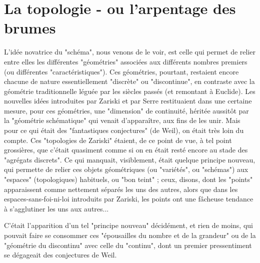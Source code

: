 \section{La topologie - ou l'arpentage des brumes}

L'idée novatrice du "schéma", nous venons de le voir, est celle qui permet de relier entre elles les différentes "géométries" associées aux différents nombres premiers (ou différentes "caractéristiques"). Ces géométries, pourtant, restaient encore chacune de nature essentiellement "discrète" ou "discontinue", en contraste avec la géométrie traditionnelle léguée par les siècles passés (et remontant à Euclide). Les nouvelles idées introduites par Zariski et par Serre restituaient dans une certaine mesure, pour ces géométries, une "dimension" de continuité, héritée aussitôt par la "géométrie schématique" qui venait d'apparaître, aux fins de les unir. Mais pour ce qui était des "fantastiques conjectures" (de Weil), on était très loin du compte. Ces "topologies de Zariski" étaient, de ce point de vue, à tel point grossières, que c'était quasiment comme si on en était resté encore au stade des "agrégats discrets". Ce qui manquait, visiblement, était quelque principe nouveau, qui permette de relier ces objets géométriques (ou "variétés", ou "schémas") aux "espaces" (topologiques) habituels, ou "bon teint" ; ceux, disons, dont les "points" apparaissent comme nettement séparés les uns des autres, alors que dans les espaces-sans-foi-ni-loi introduits par Zariski, les points ont une fâcheuse tendance à s'agglutiner les uns aux autres...

C'était l'apparition d'un tel "principe nouveau" décidément, et rien de moins, qui pouvait faire se consommer ces "épousailles du nombre et de la grandeur" ou de la "géométrie du discontinu" avec celle du "continu", dont un premier pressentiment se dégageait des conjectures de Weil.

